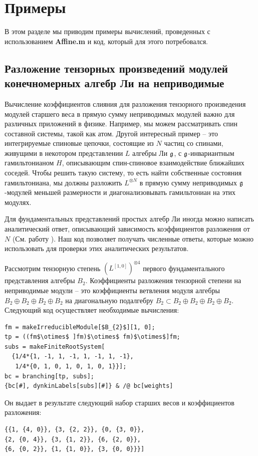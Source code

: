 \section{Примеры}
\label{sec:examples}
В этом разделе мы приводим примеры вычислений, проведенных с использованием {\bf Affine.m} и код, который для этого потребовался.

\subsection{Разложение тензорных произведений модулей конечномерных алгебр Ли на неприводимые}
\label{sec:tens-prod-decomp}

Вычисление коэффициентов слияния для разложения тензорного произведения модулей старшего веса в прямую сумму неприводимых модулей важно для различных приложений в физике. Например, мы можем рассматривать спин составной системы, такой как атом. Другой интересный пример -- это интегрируемые спиновые цепочки, состоящие из  $N$ частиц со спинами, живущими в некотором представлении  $L$ алгебры Ли $\mathfrak{g}$, с  $\mathfrak{g}$-инвариантным гамильтонианом $H$, описывающим спин-спиновое взаимодействие ближайших соседей. Чтобы решить такую систему, то есть найти собственные состояния гамильтониана, мы должны разложить  $L^{\otimes N}$ в прямую сумму неприводимых $\mathfrak{g}$-модулей меньшей размерности и диагонализовывать гамильтониан на этих модулях.

Для фундаментальных представлений простых алгебр Ли иногда можно написать аналитический ответ, описывающий зависимость коэффициентов разложения от  $N$ (См. работу \cite{LyakhovskyPostnova2011}). Наш код позволяет получать численные ответы, которые можно использовать для проверки этих аналитических результатов.

Рассмотрим тензорную степень $\left(L^{[1,0]}\right)^{\otimes 4}$ первого фундаментального представления алгебры $B_{2}$. Коэффициенты разложения тензорной степени на неприводимые модули -- это коэффициенты ветвления модуля алгебры $B_{2}\oplus B_{2}\oplus B_{2}\oplus B_{2}$ на диагональную подалгебру $B_{2}\subset B_{2}\oplus B_{2}\oplus B_{2}\oplus B_{2}$. Следующий код осуществляет необходимые вычисления:
\begin{lstlisting}[mathescape=true]
fm = makeIrreducibleModule[$B_{2}$][1, 0];
tp = ((fm$\otimes$ ]fm)$\otimes$ fm)$\otimes$]fm;
subs = makeFiniteRootSystem[
  {1/4*{1, -1, 1, -1, 1, -1, 1, -1}, 
   1/4*{0, 1, 0, 1, 0, 1, 0, 1}}];
bc = branching[tp, subs];
{bc[#], dynkinLabels[subs][#]} & /@ bc[weights]
\end{lstlisting}
Он выдает в результате следующий набор старших весов и коэффициентов разложения:
\begin{lstlisting}
{{1, {4, 0}}, {3, {2, 2}}, {0, {3, 0}}, 
{2, {0, 4}}, {3, {1, 2}}, {6, {2, 0}}, 
{6, {0, 2}}, {1, {1, 0}}, {3, {0, 0}}}]
\end{lstlisting}

